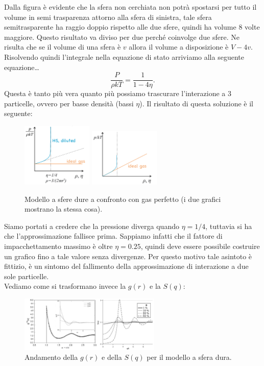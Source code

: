 \noindent
Dalla figura è evidente che la sfera non cerchiata non potrà spostarsi per tutto il volume in semi trasparenza attorno alla sfera di sinistra, tale sfera semitrasparente ha raggio doppio rispetto alle due sfere, quindi ha volume 8 volte maggiore. Questo risultato va diviso per due perché coinvolge due sfere. Ne risulta che se il volume di una sfera è $v$ allora il volume a disposizione è $V-4v$.\\
Risolvendo quindi l'integrale nella equazione di stato arriviamo alla seguente equazione\ldots
\[
	\frac{P}{\rho kT} = \frac{1}{1-4\eta}
.\] 
Questa è tanto più vera quanto più possiamo trascurare l'interazione a 3 particelle, ovvero per basse densità (bassi $\eta$). Il risultato di questa soluzione è il seguente:
\begin{figure}[H]
	\centering
	\includegraphics[width=0.3\textwidth]{figures/HS-diluited1.png}
	\includegraphics[width=0.3\textwidth]{figures/HS-diluited2.png}
	\caption{Modello a sfere dure a confronto con gas perfetto (i due grafici mostrano la stessa cosa).}
	\label{fig:figures-HS-diluited1-png}
\end{figure}
\noindent
Siamo portati a credere che la pressione diverga quando $\eta=1/4$, tuttavia si ha che l'approssimazione fallisce prima. Sappiamo infatti che il fattore di impacchettamento massimo è oltre $\eta = 0.25$, quindi deve essere possibile costruire un grafico fino a tale valore senza divergenze. Per questo motivo tale asintoto è fittizio, è un sintomo del fallimento della approssimazione di interazione a due sole particelle.\\
Vediamo come si trasformano invece la $g(r)$ e la $S(q)$:
\begin{figure}[H]
	\centering
	\includegraphics[width=0.6\textwidth]{figures/gr-sfera-dura.png}
	\caption{Andamento della $g(r)$ e della $S(q)$ per il modello a sfera dura.}
	\label{fig:figures-gr-sfera-dura-png}
\end{figure}
